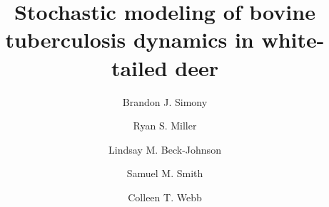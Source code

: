 \documentclass[number,preprint,review,12pt]{elsarticle}
\begin{document}
\linenumbers

\begin{frontmatter}
\title{Stochastic modeling of bovine tuberculosis dynamics in white-tailed deer}

\author[1,4]{Brandon J. Simony}
\author[2]{Ryan S. Miller} 
\author[1]{Lindsay M. Beck-Johnson}
\author[1,fn2]{Samuel M. Smith}
\author[1]{Colleen T. Webb}

\address[1]{Department of Biology, Colorado State University}
\address[2]{USDA APHIS Veterinary Services, Center for Epidemiology and Animal Health}

        
        

\end{frontmatter}
\end{document}

